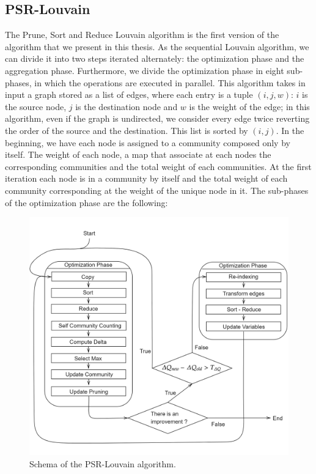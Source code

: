 \subsection{PSR-Louvain}\label{Prune-Sort-Reduce}
The Prune, Sort and Reduce Louvain algorithm is the first version of the algorithm that we present in this thesis. As the sequential Louvain algorithm, we can divide it into two steps iterated alternately: the optimization phase and the aggregation phase. 
Furthermore, we divide the optimization phase in eight sub-phases, in which the operations are executed in parallel.
This algorithm takes in input a graph stored as a list of edges, where each entry is a tuple $(i,j,w)$: $i$ is the source node, $j$ is the destination node and $w$ is the weight of the edge; in this algorithm, even if the graph is undirected, we consider every edge twice reverting the order of the source and the destination. This list is sorted by $(i,j)$. In the beginning, we have each node is assigned to a community composed only by itself.
The weight of each node, a map that associate at each nodes the corresponding communities and the total weight of each communities. At the first iteration each node is in a community by itself and the total weight of each community corresponding at the weight of the unique node in it. The sub-phases of the optimization phase are the following:\\
\begin{figure}[t]
	\centering
	\includegraphics[width=1\linewidth]{0-resources/PSR-Louvain-Schema}
	\caption{Schema of the PSR-Louvain algorithm.}
	\label{fig:psr-louvain-schema}
\end{figure}

